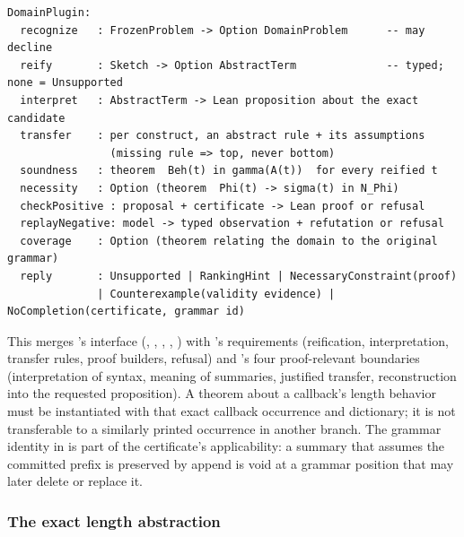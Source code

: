 \begin{lstlisting}
DomainPlugin:
  recognize   : FrozenProblem -> Option DomainProblem      -- may decline
  reify       : Sketch -> Option AbstractTerm              -- typed; none = Unsupported
  interpret   : AbstractTerm -> Lean proposition about the exact candidate
  transfer    : per construct, an abstract rule + its assumptions
                (missing rule => top, never bottom)
  soundness   : theorem  Beh(t) in gamma(A(t))  for every reified t
  necessity   : Option (theorem  Phi(t) -> sigma(t) in N_Phi)
  checkPositive : proposal + certificate -> Lean proof or refusal
  replayNegative: model -> typed observation + refutation or refusal
  coverage    : Option (theorem relating the domain to the original grammar)
  reply       : Unsupported | RankingHint | NecessaryConstraint(proof)
              | Counterexample(validity evidence) | NoCompletion(certificate, grammar id)
\end{lstlisting}
This merges 's interface (, , , , ) with 's requirements (reification, interpretation, transfer rules, proof builders, refusal) and 's four proof-relevant boundaries (interpretation of syntax, meaning of summaries, justified transfer, reconstruction into the requested proposition). A theorem about a callback's length behavior must be instantiated with that exact callback occurrence and dictionary; it is not transferable to a similarly printed occurrence in another branch. The grammar identity in  is part of the certificate's applicability: a summary that assumes the committed prefix is preserved by append is void at a grammar position that may later delete or replace it.

\subsubsection{The exact length abstraction}

